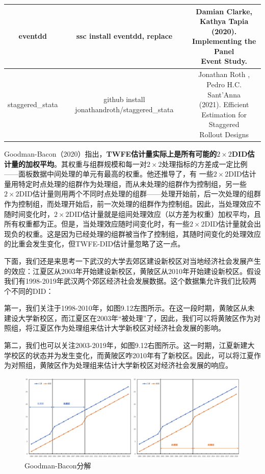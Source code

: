 \documentclass[cn,12pt,math=newtx,citestyle=gb7714-2015,bibstyle=gb7714-2015]{elegantbook}
\makeatletter
\newcommand{\tabincell}[2]{\begin{tabular}{@{}#1@{}}#2\end{tabular}}  %
\makeatother
\begin{document}
\begin{table}[htbp]
\begin{longtable}{|c|c|c|}
			eventdd	&ssc install eventdd, replace&	 \tabincell{c}{Damian Clarke,\\ Kathya Tapia (2020). \\Implementing the Panel \\Event Study.}\\
			\hline
			staggered\_stata&	github install jonathandroth/staggered\_stata&	 \tabincell{c}{Jonathan Roth , \\Pedro H.C. Sant'Anna  \\(2021). Efficient\\ Estimation for Staggered \\Rollout Designs} \\
			\hline
			
		\end{longtable}
	\end{table}
	
	
	Goodman-Bacon（2020）指出，\textbf{TWFE估计量实际上是所有可能的$2 \times 2$DID估计量的加权平均}。其权重与组群规模和每一对$2 \times 2$处理指标的方差成一定比例——面板数据中间处理的单元有最高的权重。他还推导了，有 一些$2 \times 2$DID估计量用特定时点处理的组群作为处理组，而从未处理的组群作为控制组，另一些$2 \times 2$DID估计量则用两个不同时点处理的组群——处理开始前，后一次处理的组群作为控制组，而处理开始后，前一次处理的组群作为控制组。因此，当处理效应不随时间变化时，$2 \times 2$DID估计量就是组间处理效应（以方差为权重）加权平均，且所有权重都为正。但是，当处理效应随时间变化时，有一些$2 \times 2$DID估计量就会出现负的权重。这是因为已经处理的组群被当作了控制组，其随时间变化的处理效应的比重会发生变化，但TWFE-DID估计量忽略了这一点。
	
	下面，我们还是来思考一下武汉的大学去郊区建设新校区对当地经济社会发展产生的效应：江夏区从2003年开始建设新校区，黄陂区从2010年开始建设新校区。假设我们有1998-2019年武汉两个郊区经济社会发展数据。这个数据集允许我们比较两个不同的DID：
	
	第一，我们关注于1998-2010年，如图9.12左图所示。在这一段时期，黄陂区从未建设大学新校区，而江夏区在2003年“被处理”了，因此，我们可以将黄陂区作为对照组，将江夏区作为处理组来估计大学新校区对经济社会发展的影响。
	
	第二，我们也可以关注2003-2019年，如图9.12右图所示。这一时期，江夏新建大学校区的状态并为发生变化，而黄陂区咋2010年有了新校区。因此，可以将江夏作为对照组，黄陂区作为处理组来估计大学新校区对经济社会发展的响应。
	
	
	\begin{figure}[tbph]
		\centering
		\includegraphics[width=1\linewidth]{GB_decom}
		\caption{Goodman-Bacon分解}
		\label{fig:GB_decom}
	\end{figure}
	
\end{document}
